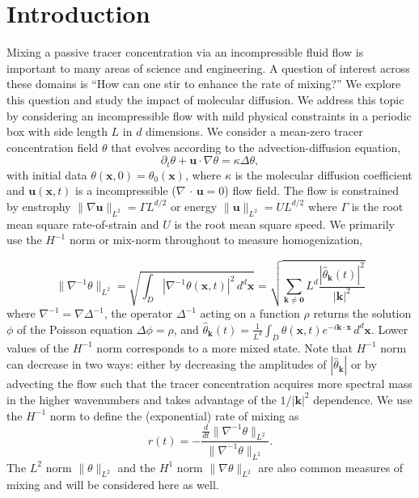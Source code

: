 \documentclass[12pt]{iopart}
\newcommand{\ddt}[1]{\frac{d #1}{dt}}
\newcommand{\hmone}[1]{\|\nabla^{-1} #1\|_{L^{2}}}
\newcommand{\ltwo}[1]{\|#1\|_{L^{2}}}
\newcommand{\hone}[1]{\| \nabla #1\|_{L^{2}}}
\newcommand{\sint}[1]{\int_{D} #1 \, d^{d}\mathbf{x}}
\renewcommand{\vec}[1]{\mathbf{#1}}
\renewcommand{\u}{\mathbf{u}}
\newcommand{\ppt}[1]{\partial_{t} #1}
\newcommand{\lap}{\Delta }
\begin{document}
\section{Introduction}

Mixing a passive tracer concentration via an incompressible fluid flow is important to many areas of science and engineering. A question of interest across these domains is ``How can one stir to enhance the rate of mixing?'' We explore this question and study the impact of molecular diffusion. We address this topic by considering an incompressible flow with mild physical constraints in a periodic box with side length $L$ in $d$ dimensions. We consider a mean-zero tracer concentration field $\theta$ that evolves according to the advection-diffusion equation,
\begin{equation}
	\label{eq:PDE_advection}
	\ppt{\theta}+\mathbf{u}\cdot \nabla \theta=\kappa \lap\theta,
\end{equation}
with initial data $\theta(\mathbf{x},0)=\theta_{0}(\mathbf{x})$, where $\kappa$ is the molecular diffusion coefficient and $\mathbf{u}(\mathbf{x},t)$ is a incompressible ($\nabla\,\cdot\, \vec{u}=0$) flow field. The flow is constrained by enstrophy $\ltwo{\nabla\u} = \Gamma L^{d/2}$ or energy $\ltwo{\u} = UL^{d/2}$ where $\Gamma$ is the root mean square rate-of-strain and $U$ is the root mean square speed. We primarily use the $H^{-1}$ norm or mix-norm throughout to measure homogenization,   

\begin{equation}
\hmone{\theta}=\sqrt{\sint{ |\nabla^{-1} \theta( \vec{x},t)|^2}}=\sqrt{ \sum_{\vec{k}\neq \vec{0}} L^d \frac{|\hat{\theta}_{\vec{k}}(t)|^{2}}{|\vec{k}|^2}}
\end{equation}
where $\nabla^{-1}=\nabla \Delta^{-1}$, the operator $\Delta^{-1}$ acting on  a function $\rho$ returns the solution $\phi$ of the Poisson equation $ \Delta \phi = \rho $, and $\hat{\theta}_{\vec{k}}(t) =  \frac{1}{L^{d}}\sint{\theta(\vec{x},t)e^{-i\vec{k}\cdot\vec{x}}}$.  Lower values of the  $H^{-1}$ norm corresponds to a more mixed state. Note that $H^{-1}$ norm can decrease in two ways: either by decreasing the amplitudes of $|\hat{\theta}_{\vec{k}}|$ or by advecting the flow such that the tracer concentration acquires more spectral mass in the higher wavenumbers and takes advantage of the $1/|\vec{k}|^2$ dependence. We use the $H^{-1}$ norm to define the (exponential) rate of mixing as
\begin{equation}
\label{eq:rate}
r(t) = -  \frac{\ddt{}\hmone{\theta}}{\hmone{\theta}}.
\end{equation}
The $L^{2}$ norm $\ltwo{\theta}$ and the $H^{1}$ norm $\hone{\theta}$ are also common measures of mixing and will be considered here as well. 
\end{document}
